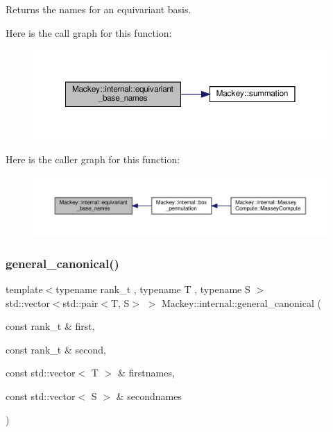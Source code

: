 Returns the names for an equivariant basis. 

Here is the call graph for this function\+:\nopagebreak
\begin{figure}[H]
\begin{center}
\leavevmode
\includegraphics[width=350pt]{namespaceMackey_1_1internal_ad3470eee0665ddd466ea1fc98adffd7c_cgraph}
\end{center}
\end{figure}
Here is the caller graph for this function\+:\nopagebreak
\begin{figure}[H]
\begin{center}
\leavevmode
\includegraphics[width=350pt]{namespaceMackey_1_1internal_ad3470eee0665ddd466ea1fc98adffd7c_icgraph}
\end{center}
\end{figure}
\mbox{\label{namespaceMackey_1_1internal_a34dd271be1fcbda4ca21877094697796}} 
\subsubsection{\texorpdfstring{general\+\_\+canonical()}{general\_canonical()}}
{\footnotesize\ttfamily template$<$typename rank\+\_\+t , typename T , typename S $>$ \\
std\+::vector$<$std\+::pair$<$T, S$>$ $>$ Mackey\+::internal\+::general\+\_\+canonical (\begin{DoxyParamCaption}\item[{const rank\+\_\+t \&}]{first,  }\item[{const rank\+\_\+t \&}]{second,  }\item[{const std\+::vector$<$ T $>$ \&}]{firstnames,  }\item[{const std\+::vector$<$ S $>$ \&}]{secondnames }\end{DoxyParamCaption})}



